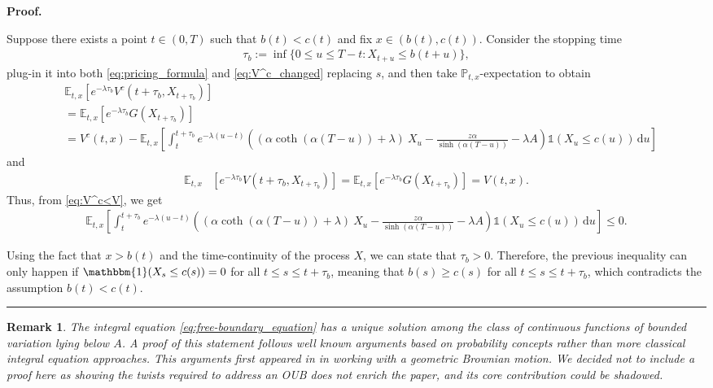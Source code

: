 \documentclass{tufte-handout}
\newtheorem{rmk}{Remark}
\newenvironment{pf}[1][Proof]{\textbf{#1.} }{\ \rule{0.5em}{0.5em}}
\begin{document}
\begin{pf}
		
		Suppose there exists a point $t\in(0, T)$ such that $b(t) < c(t)$ and fix $x\in(b(t), c(t))$. Consider the stopping time 
		\begin{align*}
		\tau_{b} := \inf\{0\leq u\leq T-t: X_{t + u} \leq b(t + u)\},
		\end{align*}
		plug-in it into both \eqref{eq:pricing_formula} and \eqref{eq:V^c_changed} replacing $s$, and then  take $\mathbb{P}_{t,x}$-expectation to obtain
		\begin{align*}
		&\mathbb{E}_{t, x}[e^{-\lambda \tau_b}V^c(t + \tau_b, X_{t + \tau_b})] \\ 
		&= \mathbb{E}_{t, x}[e^{-\lambda \tau_b}G(X_{t + \tau_b})] \\
		&= V^c(t, x) - \mathbb{E}_{t, x}\left[\int_{t}^{t + \tau_b}e^{-\lambda(u - t)}\left(\left(\alpha\coth(\alpha(T - u)) + \lambda\right)\ X_{u} - \frac{z\alpha}{\sinh(\alpha(T - u))} - \lambda A \right)\mathbb{1}\left(X_{u}\leq c(u)\right)\,\mathrm{d}u\right]
		\end{align*}
		and
		\begin{align*}
		\mathbb{E}_{t, x}&[e^{-\lambda \tau_b}V(t + \tau_b, X_{t + \tau_b})] = \mathbb{E}_{t, x}[e^{-\lambda \tau_b}G(X_{t + \tau_b})] = V(t, x).
		\end{align*} 
		Thus, from \eqref{eq:V^c<V}, we get
		\begin{align*}
		\mathbb{E}_{t, x}\left[\int_{t}^{t + \tau_b}e^{-\lambda(u - t)}\left(\left(\alpha\coth(\alpha(T - u)) + \lambda\right)\ X_{u} - \frac{z\alpha}{\sinh(\alpha(T - u))} - \lambda A \right)\mathbb{1}\left(X_{u}\leq c(u)\right)\,\mathrm{d}u\right] \leq 0.
		\end{align*}
		
		Using the fact that $x > b(t)$ and the time-continuity of the process $X$, we can state that $\tau_b > 0$. Therefore, the previous inequality can only happen if $\mathbbm{1}(X_{s} \leq c(s)) = 0$ for all $t\leq s\leq t + \tau_b$, meaning that $b(s) \geq c(s)$ for all $t\leq s\leq t + \tau_b$, which contradicts the assumption $b(t) < c(t)$.
	\end{pf}
	\else
	\begin{rmk}
		The integral equation \eqref{eq:free-boundary_equation} has a unique solution among the class of continuous functions of bounded variation lying below $A$. A proof of this statement follows well known arguments based on probability concepts rather than more classical integral equation approaches. This arguments first appeared in \citet{peskir2005ontheamerican} in working with a geometric Brownian motion. We decided not to include a proof here as showing the twists required to address an OUB does not enrich the paper, and its core contribution could be shadowed.
	\end{rmk}
	\fi
	
\end{document}
